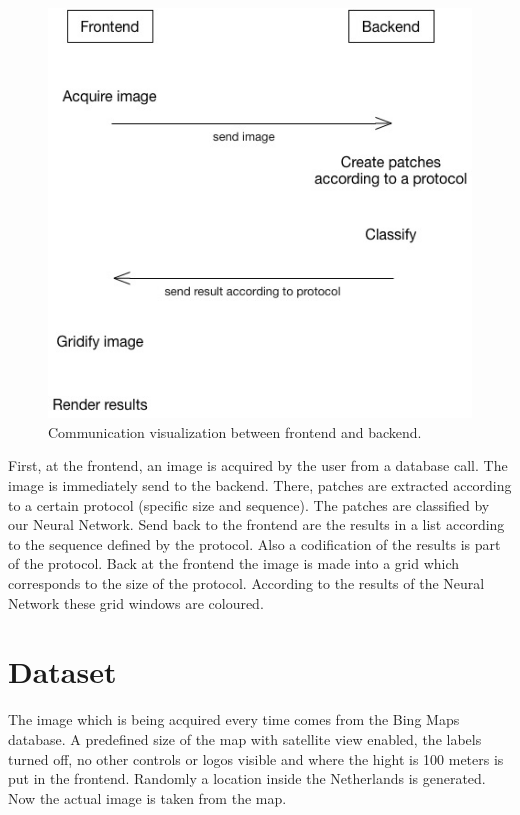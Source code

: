 \documentclass[a4paper,onecolumn]{report}
\begin{document}
\begin{figure}[h!]
    \centering
    \includegraphics[scale=0.5]{./images/communication.jpg}
    \caption{Communication visualization between frontend and backend.}
	\label{fig:communication}
\end{figure}
\noindent
First, at the frontend, an image is acquired by the user from a database call. The image is immediately send to the backend. There, patches are extracted according to a certain protocol (specific size and sequence). The patches are classified by our Neural Network. Send back to the frontend are the results in a list according to the sequence defined by the protocol. Also a codification of the results is part of the protocol. Back at the frontend the image is made into a grid which corresponds to the size of the protocol. According to the results of the Neural Network these grid windows are coloured.

\section{Dataset}
The image which is being acquired every time comes from the Bing Maps database. A predefined size of the map with satellite view enabled, the labels turned off, no other controls or logos visible and where the hight is 100 meters is put in the frontend.  Randomly a location inside the Netherlands is generated. Now the actual image is taken from the map.
\end{document}
